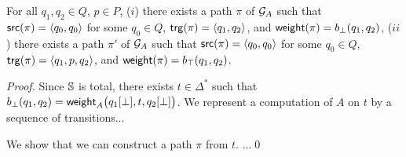 \begin{lemma}[Completeness]
For all $q_1, q_2 \in Q$, $p\in P$, 
($i$) there exists a path $\pi$ of $\mathcal{G}_A$ 
such that $\src(\pi) = \<q_0, q_0>$ for some $q_0 \in Q$, 
$\trg(\pi) = \< q_1, q_2>$,
and $\mathsf{weight}(\pi) = b_\bot(q_1, q_2)$, 
($ii$) there exists a path $\pi'$ of $\mathcal{G}_A$ 
such that $\src(\pi) = \<q_0, q_0>$ for some $q_0 \in Q$, 
$\trg(\pi) = \< q_1, p, q_2>$,
and $\mathsf{weight}(\pi) = b_\top(q_1, q_2)$.
\end{lemma}
%
\begin{proof}
Since $\mathbb{S}$ is  total, there exists $t \in \Delta^*$ such that  
$b_\bot(q_1, q_2) = \mathsf{weight}_A\bigl(q_1[{\bot}], t, q_2[{\bot}]\bigr)$.
We represent a computation of $A$ on $t$ by a sequence of transitions...

We show that we can construct a path $\pi$ from $t$.
...\qed
\end{proof}




